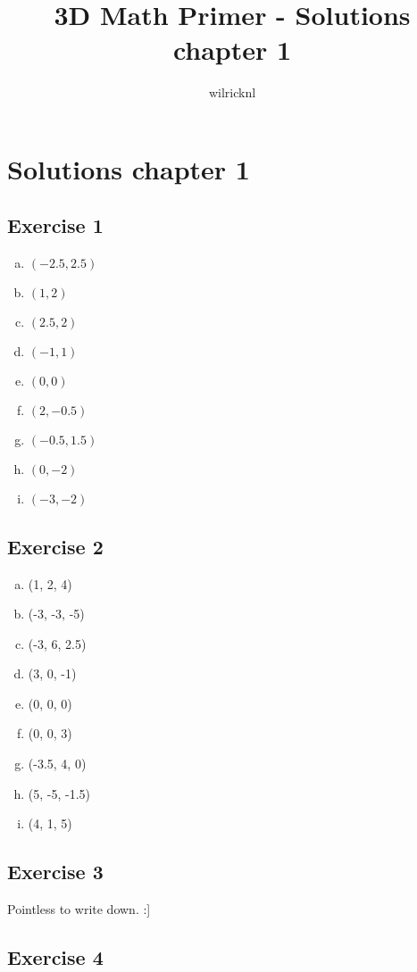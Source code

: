 \documentclass[11pt]{article}
\author{wilricknl}
\title{3D Math Primer - Solutions chapter 1}
\begin{document}
\maketitle

\section{Solutions chapter 1}

\subsection{Exercise 1}

\begin{enumerate}[a.]
\item $(-2.5, 2.5)$
\item $(1, 2)$
\item $(2.5, 2)$
\item $(-1, 1)$
\item $(0, 0)$
\item $(2, -0.5)$
\item $(-0.5, 1.5)$
\item $(0, -2)$
\item $(-3, -2)$
\end{enumerate}

\subsection{Exercise 2}

\begin{enumerate}[a.]
\item (1, 2, 4)
\item (-3, -3, -5)
\item (-3, 6, 2.5)
\item (3, 0, -1)
\item (0, 0, 0)
\item (0, 0, 3)
\item (-3.5, 4, 0)
\item (5, -5, -1.5)
\item (4, 1, 5)
\end{enumerate}

\subsection{Exercise 3}

Pointless to write down. :]


\subsection{Exercise 4}
\end{document}
